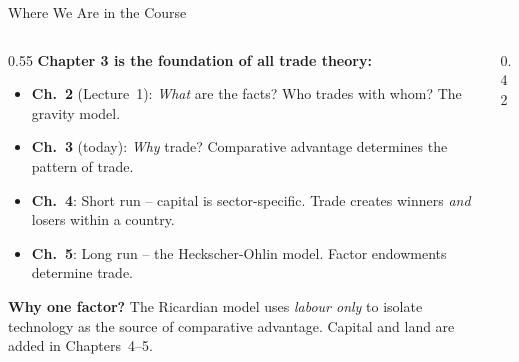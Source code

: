 \documentclass[aspectratio=169]{beamer}
\begin{document}
\begin{frame}{Where We Are in the Course}
\begin{columns}[T]
\begin{column}{0.55\textwidth}
\textbf{Chapter 3 is the foundation of all trade theory:}
\begin{itemize}\small
  \item \textbf{Ch.~2} (Lecture~1): \emph{What} are the
        facts?  Who trades with whom?  The gravity model.
  \item \textbf{Ch.~3} (today): \emph{Why} trade?
        Comparative advantage determines the pattern of
        trade.
  \item \textbf{Ch.~4}: Short run -- capital is
        sector-specific.  Trade creates winners
        \emph{and} losers within a country.
  \item \textbf{Ch.~5}: Long run -- the Heckscher-Ohlin
        model.  Factor endowments determine trade.
\end{itemize}
\vspace{0.3em}
\begin{varbox}
\footnotesize\textbf{Why one factor?}
The Ricardian model uses \emph{labour only} to isolate
technology as the source of comparative advantage.  Capital and land are
added in Chapters~4--5.
\end{varbox}
\end{column}
\begin{column}{0.42\textwidth}
\end{column}
\end{columns}
\end{frame}
\end{document}
